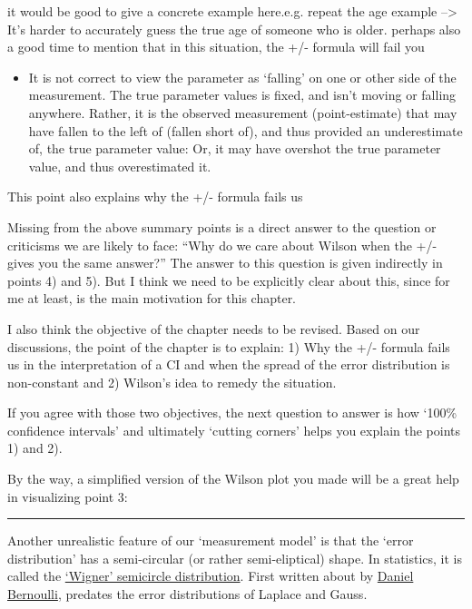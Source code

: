 \documentclass[
]{article}
\providecommand{\tightlist}{%
  \setlength{\itemsep}{0pt}\setlength{\parskip}{0pt}}
\begin{document}
it would be good to give a concrete example here.e.g. repeat the age
example --\textgreater{} It's harder to accurately guess the true age of
someone who is older. perhaps also a good time to mention that in this
situation, the +/- formula will fail you

\begin{itemize}
\tightlist
\item
  It is not correct to view the parameter as `falling' on one or other
  side of the measurement. The true parameter values is fixed, and isn't
  moving or falling anywhere. Rather, it is the observed measurement
  (point-estimate) that may have fallen to the left of (fallen short
  of), and thus provided an underestimate of, the true parameter value:
  Or, it may have overshot the true parameter value, and thus
  overestimated it.
\end{itemize}

This point also explains why the +/- formula fails us

Missing from the above summary points is a direct answer to the question
or criticisms we are likely to face: ``Why do we care about Wilson when
the +/- gives you the same answer?'' The answer to this question is
given indirectly in points 4) and 5). But I think we need to be
explicitly clear about this, since for me at least, is the main
motivation for this chapter.

I also think the objective of the chapter needs to be revised. Based on
our discussions, the point of the chapter is to explain: 1) Why the +/-
formula fails us in the interpretation of a CI and when the spread of
the error distribution is non-constant and 2) Wilson's idea to remedy
the situation.

If you agree with those two objectives, the next question to answer is
how `100\% confidence intervals' and ultimately `cutting corners' helps
you explain the points 1) and 2).

By the way, a simplified version of the Wilson plot you made will be a
great help in visualizing point 3:

\begin{center}\rule{0.5\linewidth}{0.5pt}\end{center}

Another unrealistic feature of our `measurement model' is that the
`error distribution' has a semi-circular (or rather semi-eliptical)
shape. In statistics, it is called the
\href{https://en.wikipedia.org/wiki/Wigner_semicircle_distribution}{`Wigner'
semicircle distribution}. First written about by
\href{http://www.medicine.mcgill.ca/epidemiology/hanley/bios601/Likelihood/Kendall1961OnDanielBernoulliML.pdf}{Daniel
Bernoulli}, predates the error distributions of Laplace and Gauss.
\end{document}
